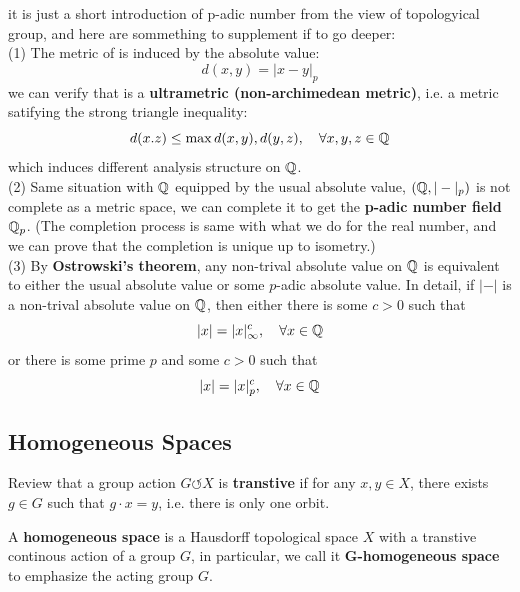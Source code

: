 \begin{remark}
    it is just a short introduction of p-adic number from the view of topologyical group, and here are sommething to supplement if to go deeper:\\

    (1) The metric of is induced by the absolute value:
    \[d(x,y) = |x-y|_p\]
    we can verify that is a \textbf{ultrametric (non-archimedean metric)}, i.e. a metric satifying the strong triangle inequality:
    \[d(x.z) \leq \max{d(x,y),d(y,z)},\quad \forall x,y,z \in \mathbb{Q}\]
    which induces different analysis structure on \(\mathbb{Q}\).\\

    (2) Same situation with \(\mathbb{Q}\) equipped by the usual absolute value, \((\mathbb{Q},|-|_p)\) is not complete as a metric space, we can complete it to get the \textbf{p-adic  number field} \(\mathbb{Q}_p\). (The completion process is same with what we do for the real number, and we can prove that the completion is unique up to isometry.)\\

    (3) By \textbf{Ostrowski's theorem}, any non-trival absolute value on \(\mathbb{Q}\) is equivalent to either the usual absolute value or some \(p\)-adic absolute value. In detail, if \(|-|\) is a non-trival absolute value on \(\mathbb{Q}\), then either there is some \(c>0\) such that
    \[|x| = |x|_{\infty}^c, \quad \forall x \in \mathbb{Q}\]
    or there is some prime \(p\) and some \(c>0\) such that
    \[|x| = |x|_{p}^c, \quad \forall x \in \mathbb{Q}\]

\end{remark}

\subsection{Homogeneous Spaces}

Review that a group action \(G \circlearrowleft X\) is \textbf{transtive} if for any \(x,y \in X\), there exists \(g \in G\) such that \(g \cdot x  = y\), i.e. there is only one orbit.

\begin{definition}
    A \textbf{homogeneous space} is a Hausdorff topological space \(X\) with a transtive continous action of a group \(G\), in particular, we call it \textbf{G-homogeneous space} to emphasize the acting group \(G\).
\end{definition}

